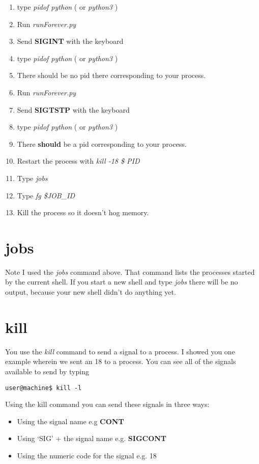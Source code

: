 \documentclass[12pt]{article}
\begin{document}
\begin{enumerate}
\item type \textit{pidof python} ( or \textit{python3} )
\item Run \textit{runForever.py}
\item Send \textbf{SIGINT} with the keyboard
\item type \textit{pidof python} ( or \textit{python3} )
\item There should be no pid there corresponding to your process.
\item Run \textit{runForever.py}
\item Send \textbf{SIGTSTP} with the keyboard
\item type \textit{pidof python} ( or \textit{python3} )
\item There \textbf{should} be a pid corresponding to your process.
\item Restart the process with \textit{kill -18 \$ PID}
\item Type \textit{jobs}
\item Type \textit{fg \$JOB\_ID}
\item Kill the process so it doesn't hog memory.
\end{enumerate}

\section{jobs}
Note I used the \textit{jobs} command above. That command lists the processes started by the current shell. If you start a new shell and type \textit{jobs} there will be no output, because your new shell didn't do anything yet.

\section{ kill }
You use the \textit{kill} command to send a signal to a process. I showed you one example wherein we sent an 18 to a process. You can see all of the signals available to send by typing 

\begin{lstlisting}
user@machine$ kill -l
\end{lstlisting}

Using the kill command you can send these signals in three ways:

\begin{itemize}
\item Using the signal name e.g \textbf{CONT}
\item Using `SIG' + the signal name e.g. \textbf{SIGCONT}
\item Using the numeric code for the signal e.g. 18
\end{itemize}
\end{document}
